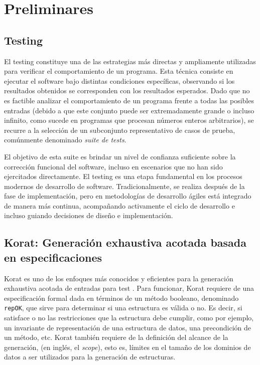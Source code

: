 \chapter[Preliminares]{Preliminares}
\label{cap:preliminares.BE}

\section{Testing}
El testing constituye una de las estrategias más directas y ampliamente utilizadas para verificar el comportamiento de un programa.
Esta técnica consiste en ejecutar el software bajo distintas condiciones específicas, observando si los resultados obtenidos se corresponden con los resultados esperados. 
Dado que no es factible analizar el comportamiento de un programa frente a todas las posibles entradas (debido a que este conjunto puede ser extremadamente grande o incluso infinito, como sucede en programas que procesan números enteros arbitrarios), 
se recurre a la selección de un subconjunto representativo de casos de prueba, comúnmente denominado \emph{suite de tests}.

El objetivo de esta suite es brindar un nivel de confianza suficiente sobre la corrección funcional del software, 
incluso en escenarios que no han sido ejercitados directamente. 
El testing es una etapa fundamental en los procesos modernos de desarrollo de software. 
Tradicionalmente, se realiza después de la fase de implementación, pero en metodologías de desarrollo ágiles está integrado de manera más continua, 
acompañando activamente el ciclo de desarrollo e incluso guiando decisiones de diseño e implementación.



\section{Korat: Generación exhaustiva acotada basada en especificaciones}
\label{sec:korat}


Korat es uno de los enfoques más conocidos y eficientes para la generación exhaustiva acotada
de entradas para test \cite{Boyapati02}.
Para funcionar, Korat requiere de una especificación formal dada en términos de
un método booleano, denominado \texttt{repOK}, que sirve para determinar si una estructura
es válida o no. Es decir, si satisface o no las restricciones que la estructura
debe cumplir, como por ejemplo, un invariante de representación de una
estructura de datos, una precondición de un método, etc. Korat también requiere 
de la definición del alcance de la generación, (en inglés, el \emph{scope}),
esto es, límites en el tamaño de los dominios de datos a ser utilizados
para la generación de estructuras.

